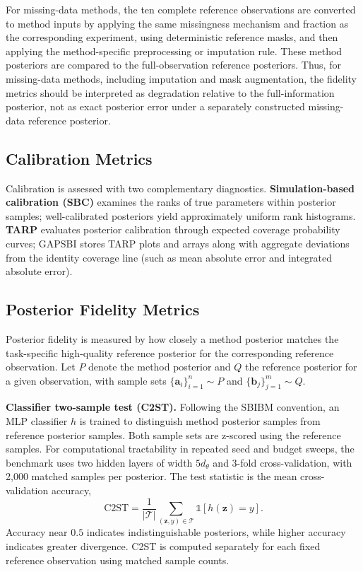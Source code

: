 \documentclass{article} %
\begin{document}
For missing-data methods, the ten complete reference observations are converted
to method inputs by applying the same missingness mechanism and fraction as the
corresponding experiment, using deterministic reference masks, and then applying
the method-specific preprocessing or imputation rule. These method posteriors
are compared to the full-observation reference posteriors. Thus, for missing-data
methods, including imputation and mask augmentation, the fidelity metrics should
be interpreted as degradation relative to the full-information posterior, not as
exact posterior error under a separately constructed missing-data reference
posterior.

\subsection{Calibration Metrics}
\label{sec:eval-calibration}

Calibration is assessed with two complementary diagnostics. \textbf{Simulation-based
calibration (SBC)} examines the ranks of true parameters within posterior samples;
well-calibrated posteriors yield approximately uniform rank histograms.
\textbf{TARP} evaluates posterior calibration through expected coverage probability
curves; GAPSBI stores TARP plots and arrays along with aggregate deviations from
the identity coverage line (such as mean absolute error and integrated absolute
error).

\subsection{Posterior Fidelity Metrics}
\label{sec:eval-fidelity}

Posterior fidelity is measured by how closely a method posterior matches the
task-specific high-quality reference posterior for the corresponding reference
observation.
Let $P$ denote the method posterior and
$Q$ the reference posterior for a given observation, with sample sets
$\{\mathbf{a}_i\}_{i=1}^{n} \sim P$ and $\{\mathbf{b}_j\}_{j=1}^{m} \sim Q$.

\textbf{Classifier two-sample test (C2ST).} Following the SBIBM convention, an
MLP classifier $h$ is trained to distinguish method posterior samples from
reference posterior samples. Both sample sets are z-scored using the reference
samples. For computational tractability in repeated seed and budget sweeps, the
benchmark uses two hidden layers of width $5d_\theta$ and 3-fold
cross-validation, with 2,000 matched samples per posterior. The test statistic
is the mean cross-validation accuracy,
\begin{equation}
  \mathrm{C2ST} =
  \frac{1}{|\mathcal{T}|} \sum_{(\mathbf{z}, y) \in \mathcal{T}}
  \mathbb{1}\!\left[ h(\mathbf{z}) = y \right].
  \label{eq:c2st}
\end{equation}
Accuracy near $0.5$ indicates indistinguishable posteriors, while higher accuracy
indicates greater divergence. C2ST is computed separately for each fixed
reference observation using matched sample counts.
\end{document}
